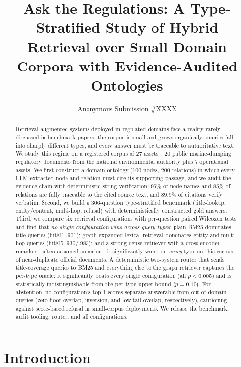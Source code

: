 \documentclass[runningheads]{llncs}
\title{Ask the Regulations: A Type-Stratified Study of Hybrid Retrieval
over Small Domain Corpora with Evidence-Audited Ontologies}
\author{Anonymous Submission \#XXXX}
\institute{Paper ID XXXX}
\begin{document}
\maketitle

\begin{abstract}
Retrieval-augmented systems deployed in regulated domains face a reality rarely
discussed in benchmark papers: the corpus is small and grows organically, queries
fall into sharply different types, and every answer must be traceable to
authoritative text. We study this regime on a registered corpus of 27
assets---20 public marine-dumping regulatory documents from the national
environmental authority plus 7 operational assets. We first construct a domain ontology (100 nodes, 200 relations) in
which every LLM-extracted node and relation must cite its supporting passage,
and we audit the evidence chain with deterministic string verification: 96\% of
node names and 85\% of relations are fully traceable to the cited source text,
and 89.9\% of citations verify verbatim. Second, we build a 306-question
type-stratified benchmark (title-lookup, entity/content, multi-hop, refusal)
with deterministically constructed gold answers. Third, we compare six
retrieval configurations with per-question paired Wilcoxon tests and find that
\emph{no single configuration wins across query types}: plain BM25 dominates
title queries (hit@1 .901); graph-expanded lexical retrieval dominates entity
and multi-hop queries (hit@5 .930/.983); and a strong dense retriever with a
cross-encoder reranker---often assumed superior---is significantly worst on
\emph{every} type on this corpus of near-duplicate official documents. A
deterministic two-system router that sends title-coverage queries to BM25 and
everything else to the graph retriever captures the per-type oracle: it
significantly beats every single configuration (all $p<0.005$) and is
statistically indistinguishable from the per-type upper bound ($p=0.10$). For
abstention, no configuration's top-1 scores separate answerable from
out-of-domain queries (zero-floor overlap, inversion, and low-tail overlap,
respectively), cautioning against score-based refusal in small-corpus
deployments. We release the benchmark, audit tooling, router, and all
configurations.

\end{abstract}

\section{Introduction}
\label{sec:intro}
\end{document}
